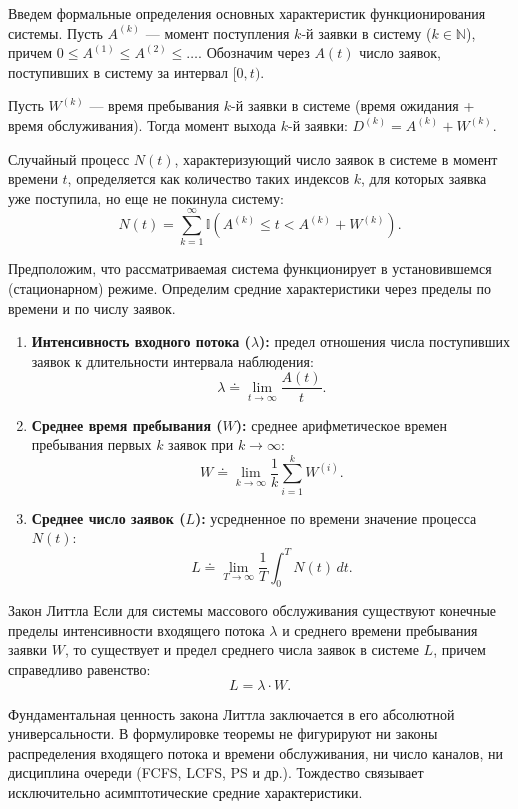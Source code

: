 Введем формальные определения основных характеристик функционирования системы.
Пусть $A^{(k)}$ — момент поступления $k$-й заявки в систему ($k \in \mathbb{N}$), причем $0 \le A^{(1)} \le A^{(2)} \le \dots$.
Обозначим через $A(t)$ число заявок, поступивших в систему за интервал $[0, t)$.

Пусть $W^{(k)}$ — время пребывания $k$-й заявки в системе (время ожидания + время обслуживания). Тогда момент выхода $k$-й заявки: $D^{(k)} = A^{(k)} + W^{(k)}$.

Случайный процесс $N(t)$, характеризующий число заявок в системе в момент времени $t$, определяется как количество таких индексов $k$, для которых заявка уже поступила, но еще не покинула систему:
$$ N(t) = \sum_{k=1}^{\infty} \mathbb{I}\left( A^{(k)} \le t < A^{(k)} + W^{(k)} \right). $$

Предположим, что рассматриваемая система функционирует в установившемся (стационарном) режиме. Определим средние характеристики через пределы по времени и по числу заявок.

\begin{enumerate}
    \item \textbf{Интенсивность входного потока ($\lambda$):} предел отношения числа поступивших заявок к длительности интервала наблюдения:
    $$ \lambda \doteq \lim_{t \to \infty} \frac{A(t)}{t}. $$
    
    \item \textbf{Среднее время пребывания ($W$):} среднее арифметическое времен пребывания первых $k$ заявок при $k \to \infty$:
    $$ W \doteq \lim_{k \to \infty} \frac{1}{k} \sum_{i=1}^{k} W^{(i)}. $$
    
    \item \textbf{Среднее число заявок ($L$):} усредненное по времени значение процесса $N(t)$:
    $$ L \doteq \lim_{T \to \infty} \frac{1}{T} \int_{0}^{T} N(t) \, dt. $$
\end{enumerate}

\begin{theorem}{Закон Литтла}
Если для системы массового обслуживания существуют конечные пределы интенсивности входящего потока $\lambda$ и среднего времени пребывания заявки $W$, то существует и предел среднего числа заявок в системе $L$, причем справедливо равенство:
$$ L = \lambda \cdot W. $$
\end{theorem}

\begin{note}
Фундаментальная ценность закона Литтла заключается в его абсолютной универсальности. В формулировке теоремы не фигурируют ни законы распределения входящего потока и времени обслуживания, ни число каналов, ни дисциплина очереди (FCFS, LCFS, PS и др.). Тождество связывает исключительно асимптотические средние характеристики.
\end{note}

